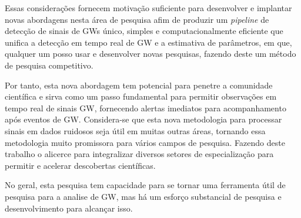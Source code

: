 Essas considerações fornecem motivação suficiente para desenvolver e implantar novas abordagens nesta área de pesquisa afim de produzir um \textit{pipeline} de detecção de sinais de GWs único, simples e computacionalmente eficiente que unifica a detecção em tempo real de GW e a estimativa de parâmetros, em que, qualquer um posso usar e desenvolver novas pesquisas, fazendo deste um método de pesquisa competitivo.

Por tanto, esta nova abordagem tem potencial para penetre a comunidade científica e sirva como um passo fundamental para permitir observações em tempo real de sinais GW, fornecendo alertas imediatos para acompanhamento após eventos de GW. Considera-se que esta nova metodologia para processar sinais em dados ruidosos seja útil em muitas outras áreas, tornando essa metodologia muito promissora para vários campos de pesquisa. Fazendo deste trabalho o alicerce para integralizar diversos setores de especialização para permitir e acelerar descobertas científicas.

No geral, esta pesquisa tem capacidade para se tornar uma ferramenta útil de pesquisa para a analise de GW, mas há um esforço substancial de pesquisa e desenvolvimento para alcançar isso.